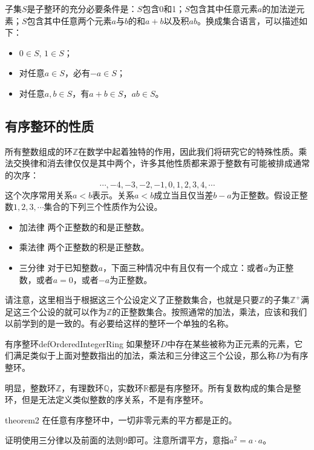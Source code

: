 子集$S$是子整环的充分必要条件是：$S$包含0和1；$S$包含其中任意元素$a$的加法逆元素；$S$包含其中任意两个元素$a$与$b$的和$a+b$以及积$ab$。换成集合语言，可以描述如下：
\begin{itemize}
\item $0 \in S$, $1 \in S$；
\item 对任意$a \in S$，必有$-a \in S$；
\item 对任意$a, b \in S$，有$a + b \in S$，$ab \in S$。
\end{itemize}

\subsection{有序整环的性质}\label{subsection00103}
所有整数组成的环$\mathbb{Z}$在数学中起着独特的作用，因此我们将研究它的特殊性质。乘法交换律和消去律仅仅是其中两个，许多其他性质都来源于整数有可能被排成通常的次序：
\[
\cdots,-4,-3,-2,-1,0,1,2,3,4,\cdots
\]
这个次序常用关系$a<b$表示。关系$a<b$成立当且仅当差$b-a$为正整数。假设正整数$1,2,3,\cdots$集合的下列三个性质作为公设。
\begin{itemize}
\item 加法律 两个正整数的和是正整数。
\item 乘法律 两个正整数的积是正整数。
\item 三分律 对于已知整数$a$，下面三种情况中有且仅有一个成立：或者$a$为正整数，或者$a=0$，或者$-a$为正整数。
\end{itemize}

请注意，这里相当于根据这三个公设定义了正整数集合，也就是只要$\mathbb{Z}$的子集$\mathbb{Z}^+$满足这三个公设的就可以作为$\mathbb{Z}$的正整数集合。按照通常的加法，乘法，应该和我们以前学到的是一致的。有必要给这样的整环一个单独的名称。

\begin{definition}{有序整环}{defOrderedIntegerRing}
如果整环$D$中存在某些被称为正元素的元素，它们满足类似于上面对整数指出的加法，乘法和三分律这三个公设，那么称$D$为有序整环。
\end{definition}

明显，整数环$\mathbb{Z}$，有理数环$\mathbb{Q}$，实数环$\mathbb{R}$都是有序整环。所有复数构成的集合是整环，但是无法定义类似整数的序关系，不是有序整环。

\begin{theorem}{}{theorem2}
在任意有序整环中，一切非零元素的平方都是正的。
\end{theorem}

证明使用三分律以及前面的法则9即可。注意所谓平方，意指$a^2 = a \cdot a$。

